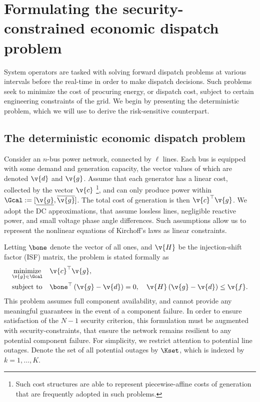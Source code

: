 
\section{Formulating the security-constrained economic dispatch problem}
\label{sec:formulation}

System operators are tasked with solving forward dispatch problems at various intervals before the real-time in order to make dispatch decisions. Such problems seek to minimize the cost of procuring energy, or dispatch cost, subject to certain engineering constraints of the grid. We begin by presenting the deterministic \ED{} problem, which we will use to derive the risk-sensitive counterpart.

\subsection{The deterministic economic dispatch problem}
Consider an $n$-bus power network, connected by $\ell$ lines. Each bus is equipped with some demand and generation capacity, the vector values of which are denoted $\v{d}$ and $\v{g}$. Assume that each generator has a linear cost, collected by the vector $\v{c}$ \footnote{Such cost structures are able to represent piecewise-affine costs of generation that are frequently adopted in such problems.}, and can only produce power within $\Gcal := [\underline{\v{g}}, \overline{\v{g}}]$. The total cost of generation is then $\v{c}^\top \v{g}$. We adopt the DC approximations, that assume lossless lines, negligible reactive power, and small voltage phase angle differences. Such assumptions allow us to represent the nonlinear equations of Kirchoff's laws as linear constraints. 

Letting $\bone$ denote the vector of all ones, and $\v{H}$ be the injection-shift factor (ISF) matrix, the \ED{} problem is stated formally as
\begin{subequations}
\begin{align}
    &\underset{\v{g} \in \Gcal}{\text{minimize}} && \v{c}^\top \v{g}, \label{eq:ED.obj} \\
    &\text{subject to} && \bone^\top \left(\v{g} - \v{d}\right) = 0, \quad \v{H} \left( \v{g} - \v{d} \right) \le \v{f}. \label{eq:ED.cons}
\end{align}
\label{eq:ED}
\end{subequations}
This problem assumes full component availability, and cannot provide any meaningful guarantees in the event of a component failure. In order to ensure satisfaction of the $N-1$ security criterion, this formulation must be augmented with security-constraints, that ensure the network remains resilient to any potential component failure. For simplicity, we restrict attention to potential line outages.
Denote the set of all potential outages by $\Kset$, which is indexed by $k = 1, \dots, K$.

